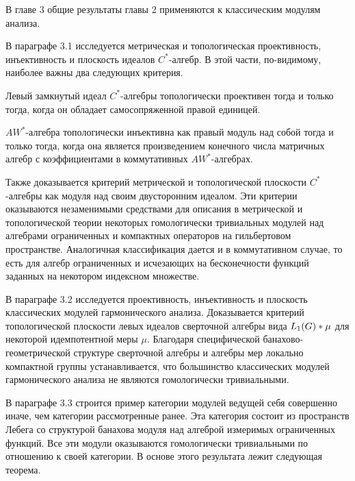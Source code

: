 В главе 3 общие результаты главы 2 применяются к классическим модулям анализа. 

В параграфе 3.1 исследуется метрическая и топологическая проективность, инъективность и плоскость идеалов $C^*$-алгебр. В этой части, по-видимому, наиболее важны два следующих критерия.

\begin{theorem*}[\ref{LeftIdealOfCStarAlgMetTopProjCharac}] Левый замкнутый идеал $C^*$-алгебры топологически проективен тогда и только тогда, когда он обладает самосопряженной правой единицей.
\end{theorem*}

\begin{theorem*}[\ref{TopInjAWStarAlgCharac}] $AW^*$-алгебра топологически инъективна как правый модуль над собой тогда и только тогда, когда она является произведением конечного числа матричных алгебр с коэффициентами в коммутативных $AW^*$-алгебрах.
\end{theorem*}

Также доказывается критерий метрической и топологической плоскости $C^*$-алгебры как модуля над своим двусторонним идеалом. Эти критерии оказываются незаменимыми средствами для описания в метрической и топологической теории некоторых гомологически тривиальных модулей над алгебрами ограниченных и компактных операторов на гильбертовом пространстве. Аналогичная классификация дается и в коммутативном случае, то есть для алгебр ограниченных и исчезающих на бесконечности функций заданных на некотором индексном множестве. 

В параграфе 3.2 исследуется проективность, инъективность и плоскость классических модулей гармонического анализа. Доказывается критерий топологической плоскости левых идеалов сверточной алгебры вида $L_1(G)\ast\mu$ для некоторой идемпотентной меры $\mu$. Благодаря специфической банахово-геометрической структуре сверточной алгебры и алгебры мер локально компактной группы устанавливается, что большинство классических модулей гармонического анализа не являются гомологически тривиальными. 

В параграфе 3.3 строится пример категории модулей ведущей себя совершенно иначе, чем категории рассмотренные ранее. Эта категория состоит из пространств Лебега со структурой банахова модуля над алгеброй измеримых ограниченных функций. Все эти модули оказываются гомологически тривиальными по отношению к своей категории. В основе этого результата лежит следующая теорема.

